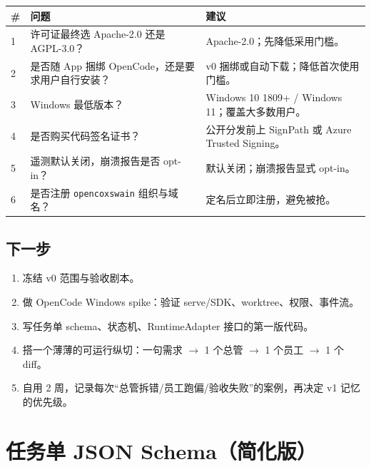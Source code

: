 \documentclass[UTF8,11pt,a4paper,fontset=windows]{ctexart}
\let\ocsection\section
\renewcommand{\section}{\Needspace{8\baselineskip}\ocsection}
\let\ocsubsection\subsection
\renewcommand{\subsection}{\Needspace{5\baselineskip}\ocsubsection}
\newcommand{\code}[1]{\texttt{#1}}
\begin{document}
\noindent\begin{minipage}{\linewidth}
\centering
{}
\small
\begin{tabularx}{\linewidth}{@{}p{0.8cm} p{5.2cm} X@{}}
\toprule
\textbf{\#} & \textbf{问题} & \textbf{建议} \\
\midrule
1 & 许可证最终选 Apache-2.0 还是 AGPL-3.0？ & Apache-2.0；先降低采用门槛。 \\
2 & 是否随 App 捆绑 OpenCode，还是要求用户自行安装？ & v0 捆绑或自动下载；降低首次使用门槛。 \\
3 & Windows 最低版本？ & Windows 10 1809+ / Windows 11；覆盖大多数用户。 \\
4 & 是否购买代码签名证书？ & 公开分发前上 SignPath 或 Azure Trusted Signing。 \\
5 & 遥测默认关闭，崩溃报告是否 opt-in？ & 默认关闭；崩溃报告显式 opt-in。 \\
6 & 是否注册 \code{opencoxswain} 组织与域名？ & 定名后立即注册，避免被抢。 \\
\bottomrule
\end{tabularx}
\end{minipage}

\subsection{下一步}

\begin{enumerate}
  \item 冻结 v0 范围与验收剧本。
  \item 做 OpenCode Windows spike：验证 serve/SDK、worktree、权限、事件流。
  \item 写任务单 schema、状态机、RuntimeAdapter 接口的第一版代码。
  \item 搭一个薄薄的可运行纵切：一句需求 $\rightarrow$ 1 个总管 $\rightarrow$ 1 个员工 $\rightarrow$ 1 个 diff。
  \item 自用 2 周，记录每次“总管拆错/员工跑偏/验收失败”的案例，再决定 v1 记忆的优先级。
\end{enumerate}

\appendix
\section{任务单 JSON Schema（简化版）}
\end{document}
